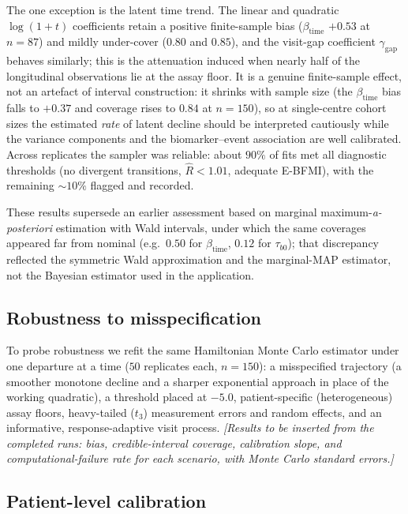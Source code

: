 \documentclass[11pt]{article}
\begin{document}
The one exception is the latent time trend. The linear and quadratic
$\log(1+t)$ coefficients retain a positive finite-sample bias
($\beta_{\mathrm{time}}$ $+0.53$ at $n=87$) and mildly under-cover ($0.80$ and
$0.85$), and the visit-gap coefficient $\gamma_{\mathrm{gap}}$ behaves
similarly; this is the attenuation induced when nearly half of the longitudinal
observations lie at the assay floor. It is a genuine finite-sample effect, not
an artefact of interval construction: it shrinks with sample size (the
$\beta_{\mathrm{time}}$ bias falls to $+0.37$ and coverage rises to $0.84$ at
$n=150$), so at single-centre cohort sizes the estimated \emph{rate} of latent
decline should be interpreted cautiously while the variance components and the
biomarker--event association are well calibrated. Across replicates the sampler
was reliable: about $90\%$ of fits met all diagnostic thresholds (no divergent
transitions, $\widehat R<1.01$, adequate E-BFMI), with the remaining $\sim10\%$
flagged and recorded.

These results supersede an earlier assessment based on marginal
maximum-\emph{a-posteriori} estimation with Wald intervals, under which the same
coverages appeared far from nominal (e.g.\ $0.50$ for $\beta_{\mathrm{time}}$,
$0.12$ for $\tau_{b0}$); that discrepancy reflected the symmetric Wald
approximation and the marginal-MAP estimator, not the Bayesian estimator used in
the application.



\subsection{Robustness to misspecification}
\label{sec:sim:misspec}

To probe robustness we refit the same Hamiltonian Monte Carlo estimator under
one departure at a time ($50$ replicates each, $n=150$): a misspecified
trajectory (a smoother monotone decline and a sharper exponential approach in
place of the working quadratic), a threshold placed at $-5.0$, patient-specific
(heterogeneous) assay floors, heavy-tailed ($t_3$) measurement errors and
random effects, and an informative, response-adaptive visit process.
\emph{[Results to be inserted from the completed runs: bias, credible-interval
coverage, calibration slope, and computational-failure rate for each scenario,
with Monte Carlo standard errors.]}

\subsection{Patient-level calibration}
\end{document}
